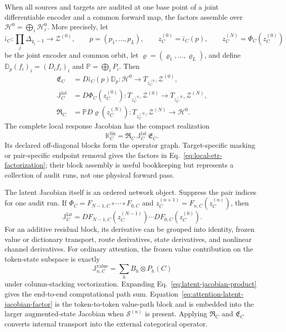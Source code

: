 \documentclass[10pt]{article}
\theoremstyle{definition}
\theoremstyle{remark}
\begin{document}
When all sources and targets are audited at one base point of a joint differentiable encoder and a
common forward map, the factors assemble over
$\mathcal H^0=\bigoplus_i\mathcal H_i^0$.  More precisely, let
\begin{equation}
\bar\iota_C:\prod_j\Delta_{q_j-1}\longrightarrow\mathscr Z^{(0)},
\qquad
p=(p_1,\ldots,p_L),
\qquad
z_C^{(0)}=\bar\iota_C(p),
\qquad
z_C^{(N)}=\Phi_C(z_C^{(0)})
\label{eq:joint-etr-anchor}
\end{equation}
be the joint encoder and common orbit, let $\varrho=(\varrho_1,\ldots,\varrho_L)$, and define
$\mathbb D_p(f_i)_i=(D_if_i)_i$ and $\mathbb P=\bigoplus_iP_i$.  Then
\begin{align}
\mathfrak E_C
&=D\bar\iota_C(p)\mathbb D_p:
\mathcal H^0\longrightarrow T_{z_C^{(0)}}\mathscr Z^{(0)},\\
\mathbb J_C^{\mathrm{lat}}
&=D\Phi_C(z_C^{(0)}):
T_{z_C^{(0)}}\mathscr Z^{(0)}\longrightarrow T_{z_C^{(N)}}\mathscr Z^{(N)},\\
\mathfrak R_C
&=\mathbb P D\varrho(z_C^{(N)}):
T_{z_C^{(N)}}\mathscr Z^{(N)}\longrightarrow\mathcal H^0.
\label{eq:global-etr-types}
\end{align}
The complete local response Jacobian has the compact realization
\begin{equation}
\boxed{
\mathbb K_C^{\mathrm{lin}}
=\mathfrak R_C\,\mathbb J_C^{\mathrm{lat}}\,\mathfrak E_C.}
\label{eq:global-etr-factorization}
\end{equation}
Its declared off-diagonal blocks form the operator graph.  Target-specific masking or pair-specific
endpoint removal gives the factors in Eq.~\ref{eq:local-etr-factorization}; their block assembly is
useful bookkeeping but represents a collection of audit runs, not one physical forward pass.

The latent Jacobian itself is an ordered network object.  Suppress the pair indices for one audit
run.  If $\Phi_C=F_{N-1,C}\circ\cdots\circ F_{0,C}$ and
$z_C^{(n+1)}=F_{n,C}(z_C^{(n)})$, then
\begin{equation}
\mathbb J_C^{\mathrm{lat}}
=DF_{N-1,C}(z_C^{(N-1)})\cdots DF_{0,C}(z_C^{(0)}).
\label{eq:latent-jacobian-product}
\end{equation}
For an additive residual block, its derivative can be grouped into identity, frozen value or
dictionary transport, route derivatives, state derivatives, and nonlinear channel derivatives.
For ordinary attention, the frozen value contribution on the token-state subspace is exactly
\begin{equation}
\mathbb J_{n,C}^{\mathrm{value}}
=\sum_h B_h\otimes P_h(C)
\label{eq:attention-latent-jacobian-factor}
\end{equation}
under column-stacking vectorization.  Expanding Eq.~\ref{eq:latent-jacobian-product} gives the
end-to-end computational path sum.  Equation~\ref{eq:attention-latent-jacobian-factor} is the
token-to-token value-path block and is embedded into the larger augmented-state Jacobian when
$\mathscr S^{(n)}$ is present.  Applying $\mathfrak R_C$ and $\mathfrak E_C$ converts internal transport
into the external categorical operator.
\end{document}
